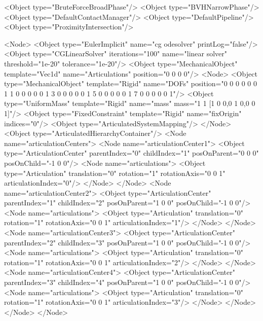 \begin{code_xml}
<Object type="BruteForceBroadPhase"/>
<Object type="BVHNarrowPhase"/>
<Object type="DefaultContactManager"/>
<Object type="DefaultPipeline"/>
<Object type="ProximityIntersection"/>

<Node>
  <Object type="EulerImplicit" name="cg odesolver" printLog="false"/>
  <Object type="CGLinearSolver" iterations="100" name="linear solver" threshold="1e-20" tolerance="1e-20"/>
  <Object type="MechanicalObject" template="Vec1d" name="Articulations"
          position="0 0 0 0"/>
  <Node>
    <Object type="MechanicalObject" template="Rigid" name="DOFs"
            position="0 0 0  0 0 0 1 
                      1 0 0  0 0 0 1 
                      3 0 0  0 0 0 1 
                      5 0 0  0 0 0 1 
                      7 0 0  0 0 0 1"/>
    <Object type="UniformMass" template="Rigid" name="mass"
            mass="1 1 [1 0 0,0 1 0,0 0 1]"/>
    <Object type="FixedConstraint" template="Rigid" name="fixOrigin"
            indices="0"/>
    <Object type="ArticulatedSystemMapping"/>
  </Node>
  <Object type="ArticulatedHierarchyContainer"/>
  <Node name="articulationCenters">
    <Node name="articulationCenter1">
      <Object type="ArticulationCenter" 
              parentIndex="0" 
              childIndex="1" 
              posOnParent="0 0 0" 
              posOnChild="-1 0 0"/>
      <Node name="articulations">
        <Object type="Articulation" 
                translation="0" 
                rotation="1" 
                rotationAxis="0 0 1" 
                articulationIndex="0"/>
      </Node>
    </Node>
    <Node name="articulationCenter2">
      <Object type="ArticulationCenter" 
              parentIndex="1" 
              childIndex="2" 
              posOnParent="1 0 0" 
              posOnChild="-1 0 0"/>
      <Node name="articulations">
        <Object type="Articulation" 
                translation="0" 
                rotation="1" 
                rotationAxis="0 0 1" 
                articulationIndex="1"/>
      </Node>
    </Node>
    <Node name="articulationCenter3">
      <Object type="ArticulationCenter" 
              parentIndex="2" 
              childIndex="3" 
              posOnParent="1 0 0" 
              posOnChild="-1 0 0"/>
      <Node name="articulations">
        <Object type="Articulation" 
                translation="0" 
                rotation="1" 
                rotationAxis="0 0 1" 
                articulationIndex="2"/>
      </Node>
    </Node>
    <Node name="articulationCenter4">
      <Object type="ArticulationCenter" 
              parentIndex="3" 
              childIndex="4" 
              posOnParent="1 0 0" 
              posOnChild="-1 0 0"/>
      <Node name="articulations">
        <Object type="Articulation" 
                translation="0" 
                rotation="1" 
                rotationAxis="0 0 1" 
                articulationIndex="3"/>
      </Node>
    </Node>
  </Node>
</Node>	

\end{code_xml}

